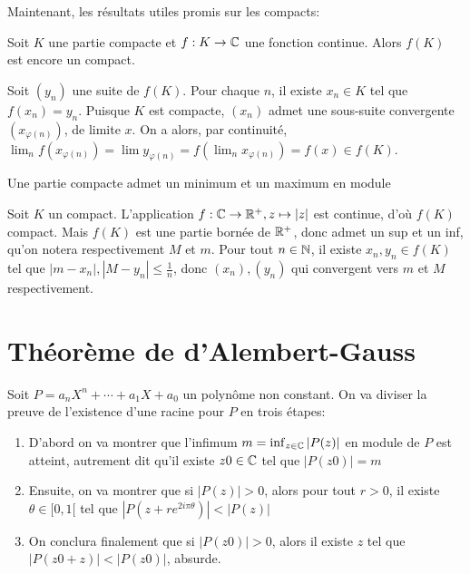 \documentclass{article}
\begin{document}
Maintenant, les résultats utiles promis sur les compacts:\\
\begin{proposition}
    Soit $K$ une partie compacte et $f: K \to \mathbb{C}$ une fonction continue. Alors $f(K)$ est encore un compact.
\end{proposition}

\begin{preuve}
    Soit $(y_n)$ une suite de $f(K)$. Pour chaque $n$, il existe $x_n \in K$ tel que $f(x_n) = y_n$. Puisque $K$ est compacte, $(x_n)$ admet une sous-suite convergente $(x_{\varphi(n)})$, de limite $x$. On a alors, par continuité, $\lim_n f(x_{\varphi(n)}) = \lim y_{\varphi(n)} = f(\lim_n x_{\varphi(n)}) = f(x) \in f(K)$.
\end{preuve}

\begin{proposition}
    Une partie compacte admet un minimum et un maximum en module
\end{proposition}

\begin{preuve}
    Soit $K$ un compact. L'application $f: \mathbb{C} \to \mathbb{R}^+, z \mapsto |z|$ est continue, d'où $f(K)$ compact. Mais $f(K)$ est une partie bornée de $\mathbb{R}^+$, donc admet un sup et un inf, qu'on notera respectivement $M$ et $m$. Pour tout $n \in \mathbb{N}$, il existe $x_n, y_n \in f(K)$ tel que $|m - x_n|, |M - y_n| \leq \frac{1}{n}$, donc $(x_n), (y_n)$ qui convergent vers $m$ et $M$ respectivement.
\end{preuve}

\section{Théorème de d'Alembert-Gauss}
Soit $P = a_nX^n + \cdots + a_1X + a_0$ un polynôme non constant. On va diviser la preuve de l'existence d'une racine pour $P$ en trois étapes:
\begin{enumerate}
    \item D'abord on va montrer que l'infimum $m = \inf_{z \in \mathbb{C}}{|P(z)|}$ en module de $P$ est atteint, autrement dit qu'il existe $z0 \in \mathbb{C}$ tel que $|P(z0)| = m$
    \item Ensuite, on va montrer que si $|P(z)| > 0$, alors pour tout $r > 0$, il existe $\theta \in [0,1[$ tel que $|P(z + r e^{2i\pi\theta})| < |P(z)|$
    \item On conclura finalement que si $|P(z0)| > 0$, alors il existe $z$ tel que $|P(z0+z)| < |P(z0)|$, absurde.
\end{enumerate}
\end{document}
